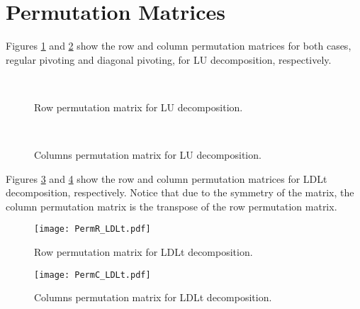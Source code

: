 \section{Permutation Matrices}\label{sec:PermutationMatrices}
Figures \ref{fig:PermutationMatrixRLU} and \ref{fig:PermutationMatrixCLU} show the row and column permutation matrices for both cases, regular pivoting and diagonal pivoting, for LU decomposition, respectively. 
\begin{figure}
    \centering
    \\
    \caption{Row permutation matrix for LU decomposition.}
    \label{fig:PermutationMatrixRLU}
\end{figure}
\begin{figure}
    \centering
    \\
    \caption{Columns permutation matrix for LU decomposition.}
    \label{fig:PermutationMatrixCLU}
\end{figure}

Figures \ref{fig:PermutationMatrixRLDLt} and \ref{fig:PermutationMatrixCLDLt} show the row and column permutation matrices for LDLt decomposition, respectively. Notice that due to the symmetry of the matrix, the column permutation matrix is the transpose of the row permutation matrix.
\begin{figure}
    \centering
    \texttt{[image: PermR\_LDLt.pdf]}
    \caption{Row permutation matrix for LDLt decomposition.}
    \label{fig:PermutationMatrixRLDLt}
\end{figure}
\begin{figure}
    \centering
    \texttt{[image: PermC\_LDLt.pdf]}
    \caption{Columns permutation matrix for LDLt decomposition.}
    \label{fig:PermutationMatrixCLDLt}
\end{figure}